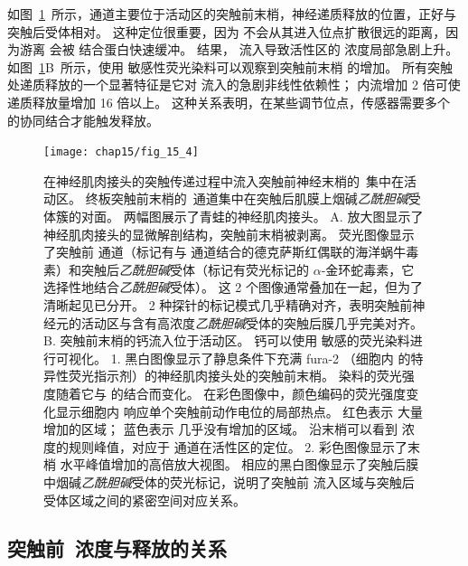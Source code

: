 如图~\ref{fig:15_4}~所示，通道主要位于活动区的突触前末梢，神经递质释放的位置，正好与突触后受体相对。
这种定位很重要，因为  不会从其进入位点扩散很远的距离，因为游离  会被  结合蛋白快速缓冲。
结果， 流入导致活性区的  浓度局部急剧上升。 
如图~\ref{fig:15_4}B~所示，使用  敏感性荧光染料可以观察到突触前末梢  的增加。
所有突触处递质释放的一个显著特征是它对  流入的急剧非线性依赖性；
 内流增加 2 倍可使递质释放量增加 16 倍以上。 
这种关系表明，在某些调节位点，传感器需要多个  的协同结合才能触发释放。


\begin{figure}[htbp]
	\centering
	\texttt{[image: chap15/fig\_15\_4]}
	\caption{在神经肌肉接头的突触传递过程中流入突触前神经末梢的~集中在活动区。
	终板突触前末梢的~通道集中在突触后肌膜上烟碱\textit{乙酰胆碱}受体簇的对面。
	两幅图展示了青蛙的神经肌肉接头。
	A. 放大图显示了神经肌肉接头的显微解剖结构，突触前末梢被剥离。
	荧光图像显示了突触前  通道（标记有与  通道结合的德克萨斯红偶联的海洋蜗牛毒素）和突触后\textit{乙酰胆碱}受体（标记有荧光标记的 $\alpha$-金环蛇毒素，它选择性地结合\textit{乙酰胆碱}受体）。
	这 2 个图像通常叠加在一起，但为了清晰起见已分开。
	2 种探针的标记模式几乎精确对齐，表明突触前神经元的活动区与含有高浓度\textit{乙酰胆碱}受体的突触后膜几乎完美对齐\cite{robitaille1990strategic}。
	B. 突触前末梢的钙流入位于活动区。
	钙可以使用  敏感的荧光染料进行可视化。
	1. 黑白图像显示了静息条件下充满 fura-2 （细胞内 的特异性荧光指示剂）的神经肌肉接头处的突触前末梢。
	染料的荧光强度随着它与  的结合而变化。
	在彩色图像中，颜色编码的荧光强度变化显示细胞内  响应单个突触前动作电位的局部热点。
	红色表示  大量增加的区域；
	蓝色表示  几乎没有增加的区域。
	沿末梢可以看到  浓度的规则峰值，对应于  通道在活性区的定位。
	2. 彩色图像显示了末梢  水平峰值增加的高倍放大视图。
	相应的黑白图像显示了突触后膜中烟碱\textit{乙酰胆碱}受体的荧光标记，说明了突触前  流入区域与突触后受体区域之间的紧密空间对应关系\cite{wachman2004spatial}。}
	\label{fig:15_4}
\end{figure}



\subsection{突触前~浓度与释放的关系}

